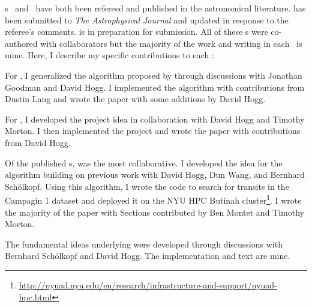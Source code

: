 \chapname s~ and~ have both been refereed and
published in the astronomical literature.
 has been submitted to \emph{The Astrophysical Journal} and updated
in response to the referee's comments.
 is in preparation for submission.
All of these \chapname s were co-authored with collaborators but the majority
of the work and writing in each \chapname\ is mine.
Here, I describe my specific contributions to each \chapname:
\begin{enumerate}

{\item For , I generalized the algorithm proposed by
\citet{Goodman:2010} through discussions with Jonathan Goodman and David Hogg.
I implemented the algorithm with contributions from Dustin Lang and wrote the
paper with some additions by David Hogg.}

{\item For , I developed the project idea in collaboration with
David Hogg and Timothy Morton.
I then implemented the project and wrote the paper with contributions from
David Hogg.}

{\item Of the published \chapname s,  was the most collaborative.
I developed the idea for the algorithm building on previous work with David
Hogg, Dun Wang, and Bernhard Sch\"olkopf.
Using this algorithm, I wrote the code to search for transits in the
 Campagin 1 dataset and deployed it on the NYU HPC Butinah
cluster\footnote{\url{http://nyuad.nyu.edu/en/research/infrastructure-and-support/nyuad-hpc.html}}.
I wrote the majority of the paper with Sections contributed by Ben Montet and
Timothy Morton.}

{\item The fundamental ideas underlying  were developed through
discussions with Bernhard Sch\"olkopf and David Hogg.
The implementation and text are mine.}

\end{enumerate}

